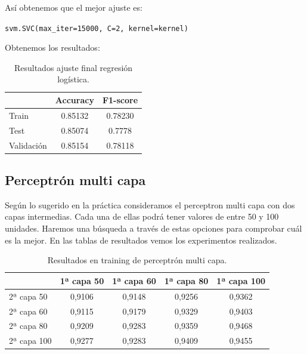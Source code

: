 \documentclass[11pt,a4paper]{article}
\begin{document}
Así obtenemos que el mejor ajuste es:

{\begin{center}
    \texttt{svm.SVC(max\_iter=15000, C=2, kernel=kernel)}
  \end{center}}

Obtenemos los resultados:

\begin{table}[h]
\begin{center}
\begin{tabular}{|l|c|c|}
\hline
  & Accuracy & F1-score \\ \hline
Train  & 0.85132 & 0.78230 \\
  Test & 0.85074 & 0.7778  \\
  Validación &0.85154 & 0.78118  \\\hline
\end{tabular}
\caption{Resultados ajuste final regresión logística.}

\end{center}
\end{table}

\newpage
\subsection{Perceptrón multi capa}

Según lo sugerido en la práctica consideramos el perceptron multi capa con dos capas intermedias. Cada una de ellas podrá tener valores de entre 50 y 100 unidades. Haremos una búsqueda a través de estas opciones para comprobar cuál es la mejor. En las tablas de resultados vemos los experimentos realizados.

\begin{table}[h]
\begin{center}
\begin{tabular}{|l|c|c|c|c|}
\hline

  & 1ª capa 50 & 1ª capa 60 & 1ª capa 80 & 1ª capa 100 \\ \hline
  2ª capa 50 & 0,9106 & 0,9148 & 0,9256 & 0,9362\\
  2ª capa 60 & 0,9115 & 0,9179 & 0,9329 & 0,9403\\
  2ª capa 80 & 0,9209 & 0,9283 & 0,9359 & 0,9468\\
  2ª capa 100 & 0,9277 & 0,9283 & 0,9409 & 0,9455\\\hline
\end{tabular}
\caption{Resultados en training de perceptrón multi capa.}

\end{center}
\end{table}
\end{document}
